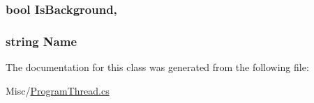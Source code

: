 \subsubsection[{Is\+Background}]{\setlength{\rightskip}{0pt plus 5cm}bool Is\+Background\hspace{0.3cm}{\ttfamily [get]}, {\ttfamily [set]}}\label{classOTA_1_1Misc_1_1ProgramThread_a198cc36e04a46019b4b374c308a4276a}
\hypertarget{classOTA_1_1Misc_1_1ProgramThread_a7ee9065718e6628dc7791b756fa6c0f9}{}
\subsubsection[{Name}]{\setlength{\rightskip}{0pt plus 5cm}string Name\hspace{0.3cm}{\ttfamily [get]}}\label{classOTA_1_1Misc_1_1ProgramThread_a7ee9065718e6628dc7791b756fa6c0f9}


The documentation for this class was generated from the following file\+:\begin{DoxyCompactItemize}
\item 
Misc/\hyperlink{ProgramThread_8cs}{Program\+Thread.\+cs}\end{DoxyCompactItemize}
